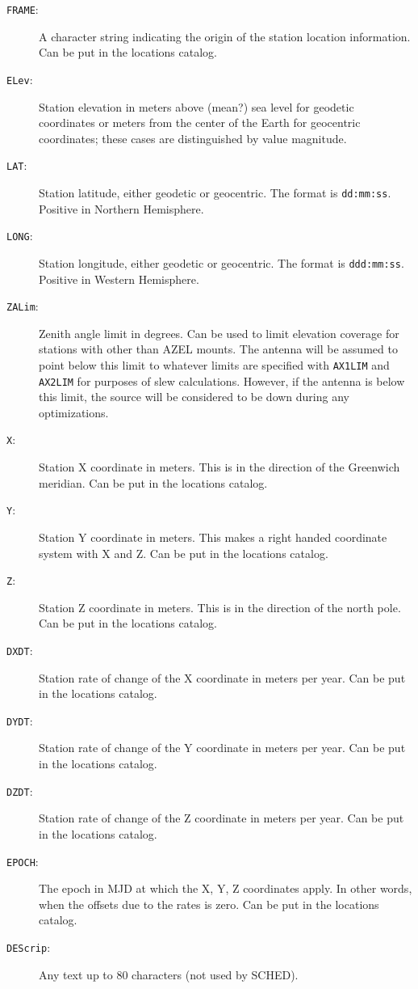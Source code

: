 \documentclass{report}
\newcommand{\sched}{{\sc SCHED}}
\begin{document}
\begin{description}

\item [{\tt FRAME}:] A character string indicating the origin
of the station location information.  Can be put in the locations
catalog.

\item [{\tt ELev}:] Station elevation in meters above (mean?) sea
level for geodetic coordinates or meters from the center of the Earth
for geocentric coordinates; these cases are distinguished by value
magnitude.

\item [{\tt LAT}:] Station latitude, either geodetic or geocentric.
The format is {\tt dd:mm:ss}. Positive in Northern Hemisphere.

\item [{\tt LONG}:] Station longitude, either geodetic or geocentric.
The format is {\tt ddd:mm:ss}. Positive in Western Hemisphere.

\item [{\tt ZALim}:] Zenith angle limit in degrees.  Can be used to
limit elevation coverage for stations with other than AZEL mounts.
The antenna will be assumed to point below this limit to whatever
limits are specified with {\tt AX1LIM} and {\tt AX2LIM} for purposes
of slew calculations.  However, if the antenna is below this limit,
the source will be considered to be down during any optimizations.

\item [{\tt X}:] Station X coordinate in meters.  This is in the
direction of the Greenwich meridian.  Can be put in the locations
catalog.

\item [{\tt Y}:] Station Y coordinate in meters.  This makes a right
handed coordinate system with X and Z.  Can be put in the locations
catalog.

\item [{\tt Z}:] Station Z coordinate in meters.  This is in the
direction of the north pole.  Can be put in the locations catalog.

\item [{\tt DXDT}:] Station rate of change of the X coordinate in
meters per year.  Can be put in the locations catalog.

\item [{\tt DYDT}:] Station rate of change of the Y coordinate
in meters per year.  Can be put in the locations catalog.

\item [{\tt DZDT}:] Station rate of change of the Z coordinate
in meters per year.  Can be put in the locations catalog.

\item [{\tt EPOCH}:] The epoch in MJD at which the X, Y, Z
coordinates apply.  In other words, when the offsets due to the
rates is zero.  Can be put in the locations catalog.

\item [{\tt DEScrip}:] Any text up to 80 characters (not used
by \sched).

\end{description}
\end{document}
